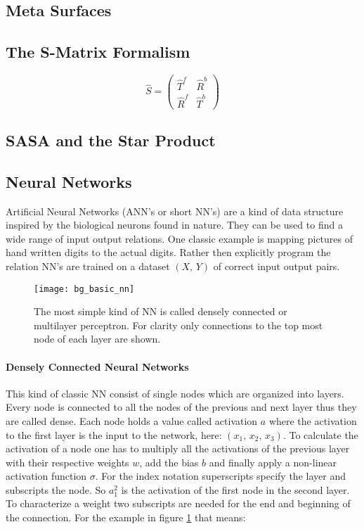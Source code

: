 \subsection{Meta Surfaces}

\subsection{The S-Matrix Formalism}

\begin{equation}
    \hat{S} =
    \begin{pmatrix}
        \hat{T}^f & \hat{R}^b \\
        \hat{R}^f & \hat{T}^b
    \end{pmatrix}
\end{equation}


\subsection{SASA and the Star Product}


\subsection{Neural Networks}
Artificial Neural Networks (ANN's or short NN's) are a kind of data structure inspired by the biological neurons found in nature. They can be used to find a wide range of input output relations. One classic example is mapping pictures of hand written digits to the actual digits. Rather then explicitly program the relation NN's are trained on a dataset $(X, \, Y)$ of correct input output pairs.
\\


\begin{figure}[H]
    \centering
    \texttt{[image: bg\_basic\_nn]}
    \caption{The most simple kind of NN is called densely connected or multilayer perceptron. For clarity only connections to the top most node of each layer are shown.}
    \label{fig:bg:basic_nn}
\end{figure}

\paragraph{Densely Connected Neural Networks}
This kind of classic NN consist of single nodes which are organized into layers. Every node is connected to all the nodes of the previous and next layer thus they are called dense. Each node holds a value called activation $a$ where the activation to the first layer is the input to the network, here:
$(x_1, \, x_2, \, x_3)$.
To calculate the activation of a node one has to multiply all the activations of the previous layer with their respective weights $w$, add the bias $b$ and finally apply a non-linear activation function $\sigma$. For the index notation superscripts specify the layer and subscripts the node. So $a^2_1$ is the activation of the first node in the second layer. To characterize a weight two subscripts are needed for the end and beginning of the connection. For the example in figure \ref{fig:bg:basic_nn} that means:


